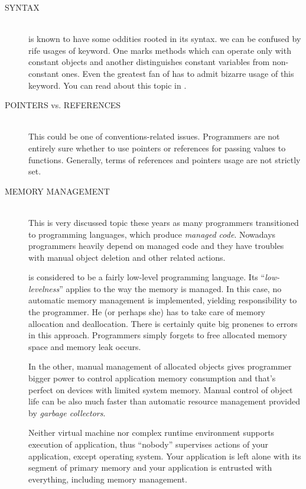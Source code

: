 \begin{description}
\item[SYNTAX\ts{\textcolor{red}{bad}}]\hfill \\
\cpp is known to have some oddities rooted in its syntax. \Eg we can be confused by rife usages of keyword. One marks methods which can operate only with constant objects and another distinguishes constant variables from non-constant ones. Even the greatest fan of \cpp has to admit bizarre usage of this keyword. You can read about this topic in \citep[p.~90-92, p.~537]{prata:cprimer}.

\item[POINTERS vs. REFERENCES\ts{\textcolor{red}{bad}}]\hfill \\
This could be one of conventions-related issues. Programmers are not entirely sure whether to use pointers or references for passing values to functions. Generally, terms of references and pointers usage are not strictly set.

\item[MEMORY MANAGEMENT\ts{\textcolor{red}{bad}, \textcolor{ultragreen}{good}}]\hfill \\
This is very discussed topic these years as many programmers transitioned to programming languages, which produce
\emph{managed code}. Nowadays programmers heavily depend on managed code and they have troubles with manual
object deletion and other related actions.

\cpp is considered to be a fairly low-level programming language. Its \enquote{\textit{low-levelness}} applies to the way the memory is managed. In this case, no automatic memory management is implemented, yielding responsibility to the programmer. He (or perhaps she) has to take care of memory allocation and deallocation. There is certainly quite big pronenes to errors in this approach. Programmers simply forgets to free allocated memory space and memory leak occurs.

In the other, manual management of allocated objects gives programmer bigger power to control application memory consumption and that's perfect on devices with limited system memory. Manual control of object life can be also much faster than automatic resource management provided by \textit{garbage collectors}.

Neither virtual machine nor complex runtime environment supports execution of \cpp application, thus \enquote{nobody} supervises actions of your application, except operating system. Your application is left alone with its segment of primary memory and your application is entrusted with everything, including memory management.


\end{description}
